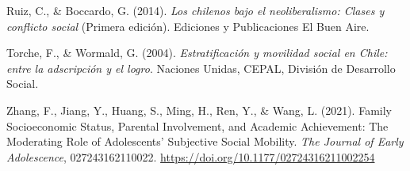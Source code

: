 \documentclass[
]{article}
\begin{document}
\leavevmode\hypertarget{ref-ruiz_chilenos_2014}{}%
Ruiz, C., \& Boccardo, G. (2014). \emph{Los chilenos bajo el
neoliberalismo: Clases y conflicto social} (Primera edición). Ediciones
y Publicaciones El Buen Aire.

\leavevmode\hypertarget{ref-torche_Estratificacion_2004}{}%
Torche, F., \& Wormald, G. (2004). \emph{Estratificación y movilidad
social en Chile: entre la adscripción y el logro}. Naciones Unidas,
CEPAL, División de Desarrollo Social.

\leavevmode\hypertarget{ref-zhang_Family_2021}{}%
Zhang, F., Jiang, Y., Huang, S., Ming, H., Ren, Y., \& Wang, L. (2021).
Family Socioeconomic Status, Parental Involvement, and Academic
Achievement: The Moderating Role of Adolescents' Subjective Social
Mobility. \emph{The Journal of Early Adolescence}, 027243162110022.
\url{https://doi.org/10.1177/02724316211002254}
\end{document}
